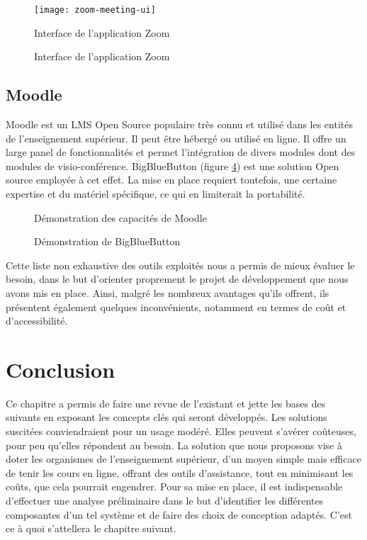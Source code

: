 \begin{figure}[H]
  \centering
  \texttt{[image: zoom-meeting-ui]}
  \caption{Interface de l'application Zoom}
  \label{fig:zoom_meeting_ui}
\end{figure}

\begin{figure}[H]
  \centering
  \caption{Interface de l'application Zoom}
  \label{fig:zoom_pricing}
\end{figure}

\subsection{Moodle}
Moodle est un LMS Open Source populaire très connu et utilisé dans les entités de l’enseignement supérieur. 
Il peut être hébergé ou utilisé en ligne. 
Il offre un large panel de fonctionnalités et permet l'intégration de divers modules dont des modules de visio-conférence. 
BigBlueButton (figure \ref{fig:bbg_demo}) est une solution Open source employée à cet effet. 
La mise en place requiert toutefois, une certaine expertise et du matériel spécifique, ce qui en limiterait la portabilité.


\begin{figure}[H]
  \centering
  \caption{Démonstration des capacités de Moodle}
  \label{fig:moodle_demo}
\end{figure}

\begin{figure}[H]
  \centering
  \caption{Démonstration de BigBlueButton}
  \label{fig:bbg_demo}
\end{figure}

Cette liste non exhaustive des outils exploités nous a permis de mieux évaluer le besoin, dans le but
d'orienter proprement le projet de développement que nous avons mis en place. Ainsi, malgré les nombreux avantages
qu'ils offrent, ils présentent également quelques inconvénients, notamment en termes de coût et d'accessibilité.

\section*{Conclusion}
Ce chapitre a permis de faire une revue de l’existant et jette les bases des 
suivants en exposant les concepts clés qui seront développés. 
Les solutions suscitées conviendraient pour un usage modéré. 
Elles peuvent s'avérer coûteuses, pour peu qu’elles répondent au besoin. 
La solution que nous proposons vise à doter les organismes de l’enseignement supérieur, 
d’un moyen simple mais efficace de tenir les cours en ligne, offrant des outils d’assistance, 
tout en minimisant les coûts, que cela pourrait engendrer. Pour sa mise en place, il est indispensable
d'effectuer une analyse préliminaire dans le but d'identifier les différentes composantes d'un tel 
système et de faire des choix de conception adaptés. C'est ce à quoi s'attellera le chapitre suivant.
